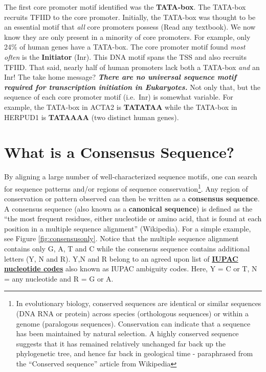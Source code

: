 \documentclass[
]{book}
\begin{document}
The first core promoter motif identified was the \textbf{TATA-box}. The TATA-box recruits TFIID to the core promoter. Initially, the TATA-box was thought to be an essential motif that \emph{all} core promoters possess (Read any textbook). We now know they are only present in a minority of core promoters. For example, only 24\% of human genes have a TATA-box. The core promoter motif found \emph{most often} is the \textbf{Initiator} (Inr). This DNA motif spans the TSS and also recruits TFIID. That said, nearly half of human promoters lack both a TATA-box \emph{and} an Inr! The take home message? \textbf{\emph{There are no universal sequence motif required for transcription initiation in Eukaryotes.}} Not only that, but the sequence of each core promoter motif (i.e.~Inr) is somewhat variable. For example, the TATA-box in ACTA2 is \textbf{TATATAA} while the TATA-box in HERPUD1 is \textbf{TATAAAA} (two distinct human genes).

\hypertarget{what-is-a-consensus-sequence}{%
\section{What is a Consensus Sequence?}\label{what-is-a-consensus-sequence}}

By aligning a large number of well-characterized sequence motifs, one can search for sequence patterns and/or regions of sequence conservation\footnote{In evolutionary biology, conserved sequences are identical or similar sequences (DNA RNA or protein) across species (orthologous sequences) or within a genome (paralogous sequences). Conservation can indicate that a sequence has been maintained by natural selection. A highly conserved sequence suggests that it has remained relatively unchanged far back up the phylogenetic tree, and hence far back in geological time - paraphrased from the ``Conserved sequence'' article from Wikipedia}. Any region of conservation or pattern observed can then be written as a \textbf{consensus sequence}. A consensus sequence (also known as a \textbf{canonical sequence}) is defined as the ``the most frequent residues, either nucleotide or amino acid, that is found at each position in a multiple sequence alignment'' (Wikipedia). For a simple example, see Figure \ref{fig:consensusonly}. Notice that the multiple sequence alignment contains only G, A, T and C while the consensus sequence contains additional letters (Y, N and R). Y,N and R belong to an agreed upon list of \href{https://www.bioinformatics.org/sms/iupac.html}{\textbf{IUPAC nucleotide codes}} also known as IUPAC ambiguity codes. Here, Y = C or T, N = any nucleotide and R = G or A.
\end{document}
